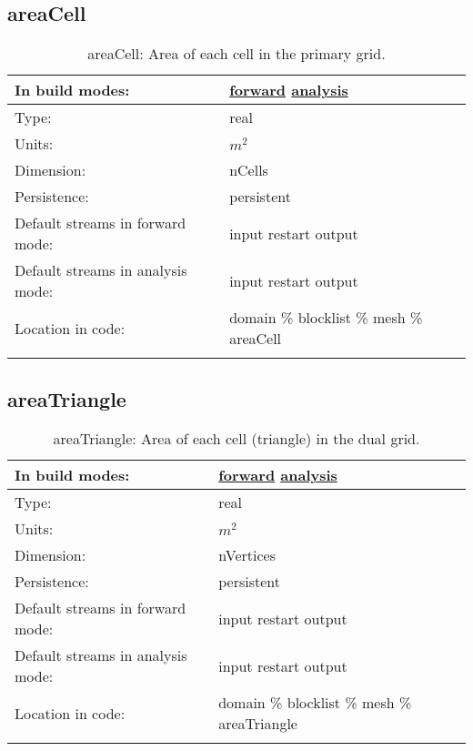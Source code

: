 \subsection[areaCell]{areaCell}
\label{subsec:var_sec_mesh_areaCell}
\begin{center}
\begin{longtable}{| p{2.0in} | p{4.0in} |}
        \hline 
        In build modes: & \hyperref[subsec:forward_var_tab_mesh]{forward} \hyperref[subsec:analysis_var_tab_mesh]{analysis} \\
        \hline 
        Type: & real \\
        \hline 
        Units: & $m^2$ \\
        \hline 
        Dimension: & nCells \\
        \hline 
        Persistence: & persistent \\
        \hline 
		 Default streams in forward mode: &  input restart output \\
        \hline 
		 Default streams in analysis mode: &  input restart output \\
        \hline 
		 Location in code: & domain \% blocklist \% mesh \% areaCell \\
		 \hline 
    \caption{areaCell: Area of each cell in the primary grid.}
\end{longtable}
\end{center}
\subsection[areaTriangle]{areaTriangle}
\label{subsec:var_sec_mesh_areaTriangle}
\begin{center}
\begin{longtable}{| p{2.0in} | p{4.0in} |}
        \hline 
        In build modes: & \hyperref[subsec:forward_var_tab_mesh]{forward} \hyperref[subsec:analysis_var_tab_mesh]{analysis} \\
        \hline 
        Type: & real \\
        \hline 
        Units: & $m^2$ \\
        \hline 
        Dimension: & nVertices \\
        \hline 
        Persistence: & persistent \\
        \hline 
		 Default streams in forward mode: &  input restart output \\
        \hline 
		 Default streams in analysis mode: &  input restart output \\
        \hline 
		 Location in code: & domain \% blocklist \% mesh \% areaTriangle \\
		 \hline 
    \caption{areaTriangle: Area of each cell (triangle) in the dual grid.}
\end{longtable}
\end{center}
